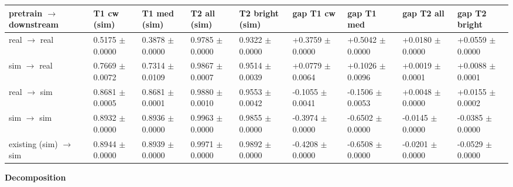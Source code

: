 \documentclass[10pt,a4paper]{article}
\begin{document}
\begin{center}\scriptsize
\setlength{\tabcolsep}{3pt}\renewcommand{\arraystretch}{1.15}
\begin{tabularx}{\linewidth}{LLLLLLLLL}
\toprule
\textbf{pretrain $\rightarrow$ downstream} & \textbf{T1 cw (sim)} & \textbf{T1 med (sim)} & \textbf{T2 all (sim)} & \textbf{T2 bright (sim)} & \textbf{gap T1 cw} & \textbf{gap T1 med} & \textbf{gap T2 all} & \textbf{gap T2 bright} \\
\midrule
real $\rightarrow$ real & 0.5175 $\pm$ 0.0000 & 0.3878 $\pm$ 0.0000 & 0.9785 $\pm$ 0.0000 & 0.9322 $\pm$ 0.0000 & +0.3759 $\pm$ 0.0000 & +0.5042 $\pm$ 0.0000 & +0.0180 $\pm$ 0.0000 & +0.0559 $\pm$ 0.0000 \\
sim $\rightarrow$ real & 0.7669 $\pm$ 0.0072 & 0.7314 $\pm$ 0.0109 & 0.9867 $\pm$ 0.0007 & 0.9514 $\pm$ 0.0039 & +0.0779 $\pm$ 0.0064 & +0.1026 $\pm$ 0.0096 & +0.0019 $\pm$ 0.0001 & +0.0088 $\pm$ 0.0001 \\
real $\rightarrow$ sim & 0.8681 $\pm$ 0.0005 & 0.8681 $\pm$ 0.0001 & 0.9880 $\pm$ 0.0010 & 0.9553 $\pm$ 0.0042 & -0.1055 $\pm$ 0.0041 & -0.1506 $\pm$ 0.0053 & +0.0048 $\pm$ 0.0000 & +0.0155 $\pm$ 0.0002 \\
sim $\rightarrow$ sim & 0.8932 $\pm$ 0.0000 & 0.8936 $\pm$ 0.0000 & 0.9963 $\pm$ 0.0000 & 0.9855 $\pm$ 0.0000 & -0.3974 $\pm$ 0.0000 & -0.6502 $\pm$ 0.0000 & -0.0145 $\pm$ 0.0000 & -0.0385 $\pm$ 0.0000 \\
existing (sim) $\rightarrow$ sim & 0.8944 $\pm$ 0.0000 & 0.8939 $\pm$ 0.0000 & 0.9971 $\pm$ 0.0000 & 0.9892 $\pm$ 0.0000 & -0.4208 $\pm$ 0.0000 & -0.6508 $\pm$ 0.0000 & -0.0201 $\pm$ 0.0000 & -0.0529 $\pm$ 0.0000 \\
\bottomrule
\end{tabularx}
\end{center}
\textbf{Decomposition}
\end{document}
